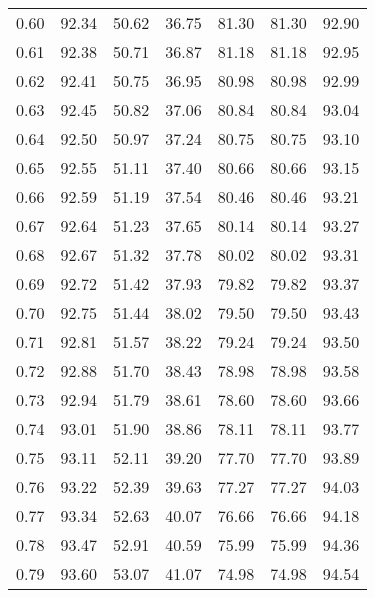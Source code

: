 \begin{tabular}{|c|c|c|c|c|c|c|}
      0.60 &     92.34 &     50.62 &      36.75 &   81.30 &      81.30 &         92.90 \\
      0.61 &     92.38 &     50.71 &      36.87 &   81.18 &      81.18 &         92.95 \\
      0.62 &     92.41 &     50.75 &      36.95 &   80.98 &      80.98 &         92.99 \\
      0.63 &     92.45 &     50.82 &      37.06 &   80.84 &      80.84 &         93.04 \\
      0.64 &     92.50 &     50.97 &      37.24 &   80.75 &      80.75 &         93.10 \\
      0.65 &     92.55 &     51.11 &      37.40 &   80.66 &      80.66 &         93.15 \\
      0.66 &     92.59 &     51.19 &      37.54 &   80.46 &      80.46 &         93.21 \\
      0.67 &     92.64 &     51.23 &      37.65 &   80.14 &      80.14 &         93.27 \\
      0.68 &     92.67 &     51.32 &      37.78 &   80.02 &      80.02 &         93.31 \\
      0.69 &     92.72 &     51.42 &      37.93 &   79.82 &      79.82 &         93.37 \\
      0.70 &     92.75 &     51.44 &      38.02 &   79.50 &      79.50 &         93.43 \\
      0.71 &     92.81 &     51.57 &      38.22 &   79.24 &      79.24 &         93.50 \\
      0.72 &     92.88 &     51.70 &      38.43 &   78.98 &      78.98 &         93.58 \\
      0.73 &     92.94 &     51.79 &      38.61 &   78.60 &      78.60 &         93.66 \\
      0.74 &     93.01 &     51.90 &      38.86 &   78.11 &      78.11 &         93.77 \\
      0.75 &     93.11 &     52.11 &      39.20 &   77.70 &      77.70 &         93.89 \\
      0.76 &     93.22 &     52.39 &      39.63 &   77.27 &      77.27 &         94.03 \\
      0.77 &     93.34 &     52.63 &      40.07 &   76.66 &      76.66 &         94.18 \\
      0.78 &     93.47 &     52.91 &      40.59 &   75.99 &      75.99 &         94.36 \\
      0.79 &     93.60 &     53.07 &      41.07 &   74.98 &      74.98 &         94.54 \\

\end{tabular}
